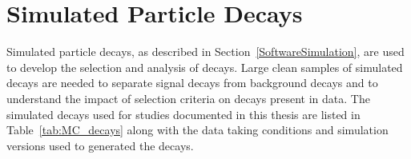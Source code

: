 \section{Simulated Particle Decays}
\label{sec:MCsamples}
Simulated particle decays, as described in Section~\ref{SoftwareSimulation}, are used to develop the selection and analysis of \bsmumu decays. Large clean samples of simulated decays are needed to separate signal decays from background decays and to understand the impact of selection criteria on decays present in data. 
The simulated decays used for studies documented in this thesis are listed in Table~\ref{tab:MC_decays} along with the data taking conditions and simulation versions used to generated the decays.

